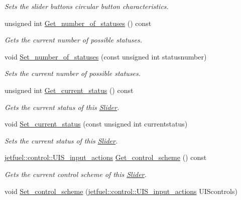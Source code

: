 \begin{DoxyCompactItemize}
\begin{DoxyCompactList}\small\item\em Sets the slider button\textquotesingle{}s circular button characteristics. \end{DoxyCompactList}\item 
unsigned int \hyperlink{classjetfuel_1_1gui_1_1Slider_a6cb71758be2833e86c9fc80c457b4b24}{Get\+\_\+number\+\_\+of\+\_\+statuses} () const
\begin{DoxyCompactList}\small\item\em Gets the current number of possible statuses. \end{DoxyCompactList}\item 
void \hyperlink{classjetfuel_1_1gui_1_1Slider_abf6238d5bd9c33e2a22f5e901b62801d}{Set\+\_\+number\+\_\+of\+\_\+statuses} (const unsigned int statusnumber)
\begin{DoxyCompactList}\small\item\em Sets the current number of possible statuses. \end{DoxyCompactList}\item 
unsigned int \hyperlink{classjetfuel_1_1gui_1_1Slider_a62ef1133fbbea679b51d7ecf4ba4b6a8}{Get\+\_\+current\+\_\+status} () const
\begin{DoxyCompactList}\small\item\em Gets the current status of this \hyperlink{classjetfuel_1_1gui_1_1Slider}{Slider}. \end{DoxyCompactList}\item 
void \hyperlink{classjetfuel_1_1gui_1_1Slider_aa7a8125e92817f0df7899cc23f34fce7}{Set\+\_\+current\+\_\+status} (const unsigned int currentstatus)
\begin{DoxyCompactList}\small\item\em Sets the current status of this \hyperlink{classjetfuel_1_1gui_1_1Slider}{Slider}. \end{DoxyCompactList}\item 
\hyperlink{structjetfuel_1_1control_1_1UIS__input__actions}{jetfuel\+::control\+::\+U\+I\+S\+\_\+input\+\_\+actions} \hyperlink{classjetfuel_1_1gui_1_1Slider_a65b6eea54c4b4b78d0522b9eda83db0b}{Get\+\_\+control\+\_\+scheme} () const
\begin{DoxyCompactList}\small\item\em Gets the current control scheme of this \hyperlink{classjetfuel_1_1gui_1_1Slider}{Slider}. \end{DoxyCompactList}\item 
void \hyperlink{classjetfuel_1_1gui_1_1Slider_a64531a8ed9353906ffb8e1b5720e9409}{Set\+\_\+control\+\_\+scheme} (\hyperlink{structjetfuel_1_1control_1_1UIS__input__actions}{jetfuel\+::control\+::\+U\+I\+S\+\_\+input\+\_\+actions} U\+I\+Scontrols)

\end{DoxyCompactItemize}
